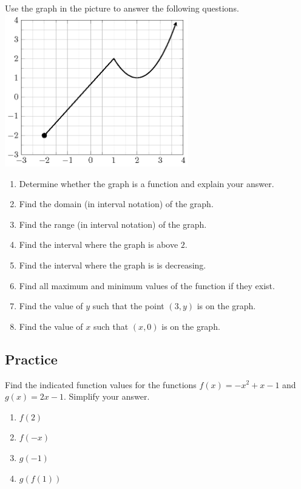 \begin{example}

Use the graph in the picture to answer the following questions.\\
\includegraphics[width=0.6\textwidth]{figs/function-example-quadratic.png}

\begin{enumerate}[itemsep=2\baselineskip]
\item
  Determine whether the graph is a function and explain your answer.
\item
  Find the domain (in interval notation) of the graph.
\item
  Find the range (in interval notation) of the graph.
\item
  Find the interval where the graph is above \(2\).

\item
  Find the interval where the graph is is decreasing.

\item
  Find all maximum and minimum values of the function if they exist.
\item
  Find the value of \(y\) such that the point \((3, y)\) is on the
  graph.
\item
  Find the value of \(x\) such that \((x, 0)\) is on the graph.
\end{enumerate}

\end{example}



\subsection{Practice}

\begin{exercise}

Find the indicated function values for the functions \(f(x)=-x^2+x-1\)
and \(g(x)=2x-1\). Simplify your answer.

\begin{enumerate}[twocol]
\item
  \(f(2)\)
\item
  \(f(-x)\)
\item
  \(g(-1)\)
\item
  \(g(f(1))\)
\end{enumerate}
\end{exercise}


